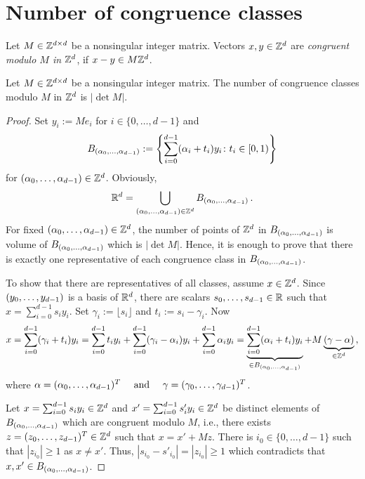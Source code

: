 \section{Number of congruence classes}

\begin{defn}
Let $M\in\mathbb{Z}^{d\times d}$ be a nonsingular integer matrix. Vectors $x,y \in \mathbb{Z}^d$ are \emph{congruent modulo $M$ in $\mathbb{Z}^d$}, if $x-y \in M\mathbb{Z}^d$.
\end{defn}

\begin{lem}
Let $M\in\mathbb{Z}^{d\times d}$ be a nonsingular integer matrix. The number of congruence classes modulo $M$ in $\mathbb{Z}^d$ is $|\det M|$.
\label{lem:numCongruenceClasses}
\end{lem}
\begin{proof}
Set $y_i:=M e_i$ for $i\in\{0, \dots, d-1 \}$ and 
$$
B_{({\alpha}_0,\ldots,{\alpha}_{d-1})}:=\left\{\sum_{i=0}^{d-1} (\alpha_i + t_i) y_i \colon t_i \in [0,1)\right\}
$$
for $({\alpha}_0,\ldots,{\alpha}_{d-1}) \in \mathbb{Z}^d$. Obviously,
$$
\mathbb{R}^d=\bigcup_{({\alpha}_0,\ldots,{\alpha}_{d-1}) \in \mathbb{Z}^d} B_{({\alpha}_0,\ldots,{\alpha}_{d-1})}\,.
$$
For fixed $({\alpha}_0,\ldots,{\alpha}_{d-1}) \in \mathbb{Z}^d$, the number of points of $\mathbb{Z}^d$ in $B_{({\alpha}_0,\ldots,{\alpha}_{d-1})}$  is volume of $B_{({\alpha}_0,\ldots,{\alpha}_{d-1})}$  which is $|\det M|$. Hence, it is enough to prove that there is exactly one representative of each congruence class in $B_{({\alpha}_0,\ldots,{\alpha}_{d-1})}$. 

To show that there are representatives of all classes, assume $x\in\mathbb{Z}^d$. Since $({y}_0,\ldots,{y}_{d-1})$ is a basis of $\mathbb{R}^d$, there are scalars $s_0, \dots, s_{d-1}\in \mathbb{R}$ such that $x= \sum_{i=0}^{d-1} s_i y_i$. Set $\gamma_i:=\lfloor s_i \rfloor$ and $t_i:=s_i-\gamma_i$. Now
\begin{align*}
 x=\sum_{i=0}^{d-1} (\gamma_i+t_i) y_i=\sum_{i=0}^{d-1}t_i y_i +\sum_{i=0}^{d-1} (\gamma_i-\alpha_i)y_i + \sum_{i=0}^{d-1} \alpha_i y_i=\underbrace{\sum_{i=0}^{d-1} (\alpha_i+t_i)y_i}_{\in B_{({\alpha}_0,\ldots,{\alpha}_{d-1})} } +M\underbrace{(\gamma-\alpha)}_{\in\mathbb{Z}^d}\,,
\end{align*}
where $\alpha=({\alpha}_0,\ldots,{\alpha}_{d-1})^T \quad \text{ and }\quad \gamma=({\gamma}_0,\ldots,{\gamma}_{d-1})^T$.

Let $x=\sum_{i=0}^{d-1} s_i y_i \in \mathbb{Z}^d$ and $x'=\sum_{i=0}^{d-1}s'_i y_i \in \mathbb{Z}^d$ be distinct elements of $B_{({\alpha}_0,\ldots,{\alpha}_{d-1})}$ which are congruent modulo $M$, i.e., there exists $z=({z}_0,\ldots,{z}_{d-1})^T\in\mathbb{Z}^d$ such that $x=x'+M z$. There is $i_0\in\{0, \dots , d-1\}$ such that $|z_{i_0}|\geq 1$ as $x\neq x'$. Thus, $|s_{i_0}-s'_{i_0}|=|z_{i_0}|\geq 1$ which contradicts that  $x, x'\in B_{({\alpha}_0,\ldots,{\alpha}_{d-1})}$.
\end{proof}

